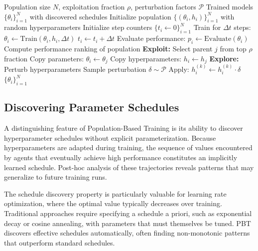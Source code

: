 \begin{algorithm}[htbp]
\caption{Population-Based Training (PBT)}
\label{alg:pbt}
\begin{algorithmic}[1]
\Require Population size $N$, exploitation fraction $\rho$, perturbation factors $\mathcal{P}$
\Ensure Trained models $\{\theta_i\}_{i=1}^N$ with discovered schedules
\State Initialize population $\{(\theta_i, h_i)\}_{i=1}^N$ with random hyperparameters
\State Initialize step counters $\{t_i \gets 0\}_{i=1}^N$
        \State Train for $\Delta t$ steps: $\theta_i \gets \text{Train}(\theta_i, h_i, \Delta t)$
        \State $t_i \gets t_i + \Delta t$
        \State Evaluate performance: $p_i \gets \text{Evaluate}(\theta_i)$
    \EndFor
    \State Compute performance ranking of population
        \State \textbf{Exploit:} Select parent $j$ from top $\rho$ fraction
        \State Copy parameters: $\theta_i \gets \theta_j$
        \State Copy hyperparameters: $h_i \gets h_j$
        \State \textbf{Explore:} Perturb hyperparameters
            \State Sample perturbation $\delta \sim \mathcal{P}$
            \State Apply: $h_i^{(k)} \gets h_i^{(k)} \cdot \delta$ 
        \EndFor
    \EndFor
\EndWhile
\State \Return $\{\theta_i\}_{i=1}^N$
\end{algorithmic}
\end{algorithm}

\subsection{Discovering Parameter Schedules}
\label{subsec:pbt_schedules}

A distinguishing feature of Population-Based Training is its ability to discover hyperparameter schedules without explicit parameterization. Because hyperparameters are adapted during training, the sequence of values encountered by agents that eventually achieve high performance constitutes an implicitly learned schedule. Post-hoc analysis of these trajectories reveals patterns that may generalize to future training runs.

The schedule discovery property is particularly valuable for learning rate optimization, where the optimal value typically decreases over training. Traditional approaches require specifying a schedule a priori, such as exponential decay or cosine annealing, with parameters that must themselves be tuned. PBT discovers effective schedules automatically, often finding non-monotonic patterns that outperform standard schedules.

